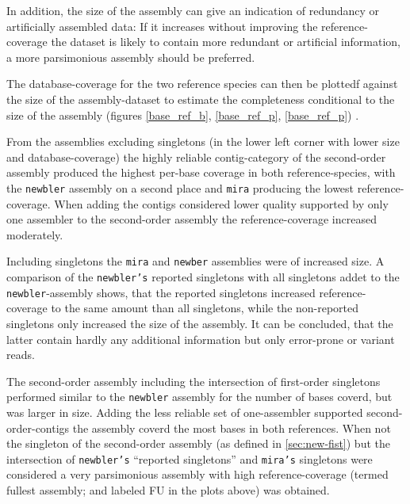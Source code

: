In addition, the size of the assembly can give an indication of
redundancy or artificially assembled data: If it increases without
improving the reference-coverage the dataset is likely to contain
more redundant or artificial information, a more parsimonious assembly
should be preferred.

The database-coverage for the two reference species can then be
plottedf against the size of the assembly-dataset to estimate the
completeness conditional to the size of the assembly (figures
\ref{base_ref_b}, \ref{base_ref_p}, \ref{base_ref_p}) .

From the assemblies excluding singletons (in the lower left corner
with lower size and database-coverage) the highly reliable
contig-category of the second-order assembly produced the highest
per-base coverage in both reference-species, with the \texttt{newbler}
assembly on a second place and \texttt{mira} producing the lowest
reference-coverage. When adding the contigs considered lower quality
supported by only one assembler to the second-order assembly the
reference-coverage increased moderately.

Including singletons the \texttt{mira} and \texttt{newber} assemblies
were of increased size. A comparison of the \texttt{newbler's}
reported singletons with all singletons addet to the
\texttt{newbler}-assembly shows, that the reported singletons
increased reference-coverage to the same amount than all singletons,
while the non-reported singletons only increased the size of the
assembly. It can be concluded, that the latter contain hardly any
additional information but only error-prone or variant reads.

The second-order assembly including the intersection of first-order
singletons performed similar to the \texttt{newbler} assembly for the
number of bases coverd, but was larger in size. Adding the less
reliable set of one-assembler supported second-order-contigs the
assembly coverd the most bases in both references. When not the
singleton of the second-order assembly (as defined in
\ref{sec:new-fist}) but the intersection of \texttt{newbler's}
``reported singletons'' and \texttt{mira's} singletons were considered
a very parsimonious assembly with high reference-coverage (termed
fullest assembly; and labeled FU in the plots above) was obtained.




